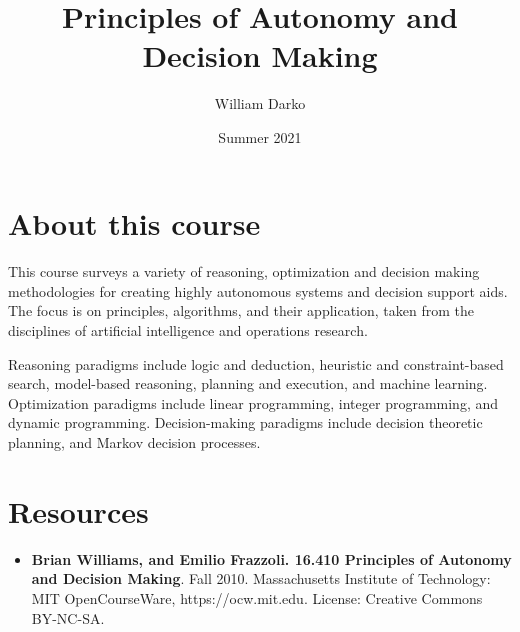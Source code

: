 \documentclass[12pt, a4paper]{article}
\title{Principles of Autonomy and Decision Making}
\author{William Darko}
\date{Summer 2021}
\begin{document}
\maketitle
\newpage

\tableofcontents

\newpage

\section{About this course}
\paragraph*{}
This course surveys a variety of reasoning, optimization and decision 
making methodologies for creating highly autonomous systems and decision 
support aids. The focus is on principles, algorithms, and their 
application, taken from the disciplines of artificial intelligence and 
operations research.

Reasoning paradigms include logic and deduction, heuristic and 
constraint-based search, model-based reasoning, planning and execution, 
and machine learning. Optimization paradigms include linear programming, 
integer programming, and dynamic programming. Decision-making paradigms 
include decision theoretic planning, and Markov decision processes.



\newpage

\section{Resources}

\begin{itemize}
   \item \textbf{Brian Williams, and Emilio Frazzoli. 16.410 Principles of Autonomy and Decision Making}. 
   Fall 2010. Massachusetts Institute of Technology: MIT OpenCourseWare, 
   https://ocw.mit.edu. License: Creative Commons BY-NC-SA.
\end{itemize}

\newpage
\end{document}
